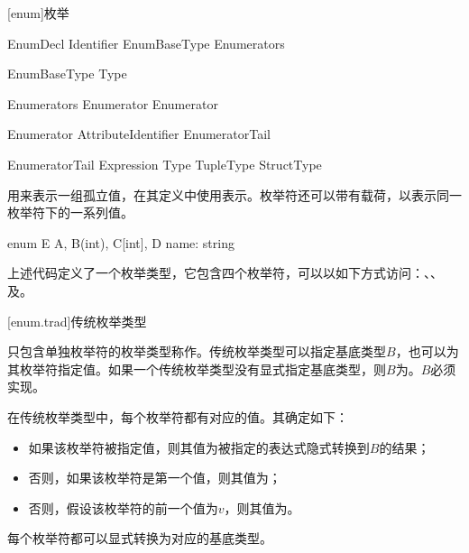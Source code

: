 
[enum]{枚举}

\begin{bnf}{EnumDecl}
     Identifier EnumBaseType\bnfq \terminal{\{} Enumerators \terminal{\}}
\end{bnf}

\begin{bnf}{EnumBaseType}
    \terminal{:} Type
\end{bnf}

\begin{bnf}{Enumerators}
    Enumerator \bnflp \terminal{,} Enumerator \bnfrp\bnfs \terminal{,}\bnfq
\end{bnf}

\begin{bnf}{Enumerator}
    Attribute\bnfq Identifier EnumeratorTail\bnfq
\end{bnf}

\begin{bnf}{EnumeratorTail}
    \terminal{=} Expression \br
    \terminal{[} Type \terminal{]} \br
    TupleType \br
    StructType
\end{bnf}

\pnum
{}用来表示一组孤立值，在其定义中使用表示。枚举符还可以带有载荷，以表示同一枚举符下的一系列值。

\enterexample
\begin{codeblock}

enum E {
    A,
    B(int),
    C[int],
    D{ name: string }
}

\end{codeblock}

上述代码定义了一个枚举类型，它包含四个枚举符，可以以如下方式访问：、、及。
\exitexample

[enum.trad]{传统枚举类型}

\pnum
只包含单独枚举符的枚举类型称作。传统枚举类型可以指定基底类型$B$，也可以为其枚举符指定值。如果一个传统枚举类型没有显式指定基底类型，则$B$为。$B$必须实现。

\pnum
在传统枚举类型中，每个枚举符都有对应的值。其确定如下：

\begin{itemize}
    \item 如果该枚举符被指定值，则其值为被指定的表达式隐式转换到$B$的结果；
    \item 否则，如果该枚举符是第一个值，则其值为；
    \item 否则，假设该枚举符的前一个值为$v$，则其值为。
\end{itemize}

每个枚举符都可以显式转换为对应的基底类型。